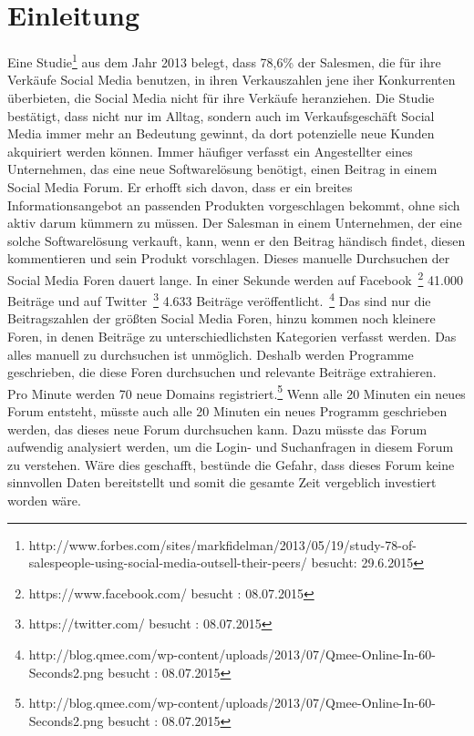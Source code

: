 
\section{Einleitung}
Eine Studie\footnote{http://www.forbes.com/sites/markfidelman/2013/05/19/study-78-of-salespeople-using-social-media-outsell-their-peers/ besucht: 29.6.2015} aus dem Jahr 2013 belegt, dass 78,6\% der Salesmen, die für ihre Verkäufe Social Media benutzen, in ihren Verkauszahlen jene iher Konkurrenten überbieten, die Social Media nicht für ihre Verkäufe heranziehen.
Die Studie bestätigt, dass nicht nur im Alltag, sondern auch im Verkaufsgeschäft Social Media immer mehr an Bedeutung gewinnt, da dort potenzielle neue Kunden akquiriert werden können. Immer häufiger verfasst ein Angestellter eines Unternehmen, das eine neue Softwarelösung benötigt, einen Beitrag in einem Social Media Forum. Er erhofft sich davon, dass er ein breites Informationsangebot an passenden Produkten vorgeschlagen bekommt, ohne sich aktiv darum kümmern zu müssen. Der Salesman in einem Unternehmen, der eine solche Softwarelösung verkauft, kann, wenn er den Beitrag händisch findet, diesen kommentieren und sein Produkt vorschlagen. 
Dieses manuelle Durchsuchen der Social Media Foren dauert lange. In einer Sekunde werden auf Facebook~\footnote{https://www.facebook.com/ besucht : 08.07.2015} 41.000 Beiträge und auf Twitter~\footnote{https://twitter.com/ besucht : 08.07.2015} 4.633 Beiträge veröffentlicht.~\footnote{http://blog.qmee.com/wp-content/uploads/2013/07/Qmee-Online-In-60-Seconds2.png besucht : 08.07.2015} Das sind nur die Beitragszahlen der größten Social Media Foren, hinzu kommen noch kleinere Foren, in denen Beiträge zu unterschiedlichsten Kategorien verfasst werden. Das alles manuell zu durchsuchen ist unmöglich. Deshalb werden Programme geschrieben, die diese Foren durchsuchen und relevante Beiträge extrahieren. \\ Pro Minute werden 70 neue Domains registriert.\footnote{http://blog.qmee.com/wp-content/uploads/2013/07/Qmee-Online-In-60-Seconds2.png besucht : 08.07.2015} Wenn alle 20 Minuten ein neues Forum entsteht, müsste auch alle 20 Minuten ein neues Programm geschrieben werden, das dieses neue Forum durchsuchen kann. Dazu müsste das Forum aufwendig analysiert werden, um die Login- und Suchanfragen in diesem Forum zu verstehen. Wäre dies geschafft, bestünde die Gefahr, dass dieses Forum keine sinnvollen Daten bereitstellt und somit die gesamte Zeit vergeblich investiert worden wäre.\\
